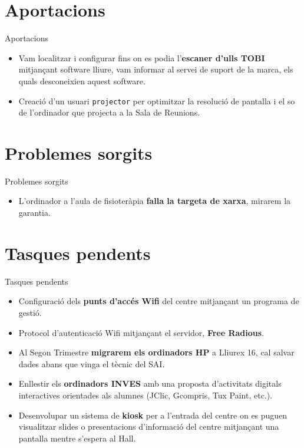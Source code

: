 \documentclass[xcolor=dvipsnames]{beamer}
\begin{document}
\section{Aportacions}
\begin{frame}{Aportacions}

\begin{itemize}
\item<1->
  Vam localitzar i configurar fins on es podia l'\textbf{escaner d'ulls TOBI}
  mitjançant software lliure, vam informar al servei de suport de la
  marca, els quals desconeixien aquest software.
\item<2->
  Creació d'un usuari \texttt{projector} per optimitzar la resolució de
  pantalla i el so de l'ordinador que projecta a la Sala de Reunions.
\end{itemize}
\end{frame}

\section{Problemes sorgits}
\begin{frame}{Problemes sorgits}

\begin{itemize}
\item<1->
  L'ordinador a l'aula de fisioteràpia \textbf{falla la targeta de xarxa},
  mirarem la garantia.
\end{itemize}
\end{frame}

\section{Tasques pendents}
\begin{frame}{Tasques pendents}

\begin{itemize}
\item<1->Configuració dels \textbf{punts d'accés Wifi} del centre
  mitjançant un programa de gestió.
\item<2->
  Protocol d'autenticació Wifi mitjançant el servidor, \textbf{Free
  Radious}.
\item<3->
  Al Segon Trimestre \textbf{migrarem els ordinadors HP} a Lliurex 16, cal salvar
  dades abans que vinga el tècnic del SAI.
\item<4->
  Enllestir els \textbf{ordinadors INVES} amb una proposta d'activitats digitals
  interactives orientades als alumnes (JClic, Gcompris, Tux Paint, etc.).
\item<5->
  Desenvolupar un sistema de \textbf{kiosk} per a l'entrada del centre on es
  puguen visualitzar slides o presentacions d'informació del centre
  mitjançant una pantalla mentre s'espera al Hall.
\end{itemize}
\end{frame}
\end{document}
